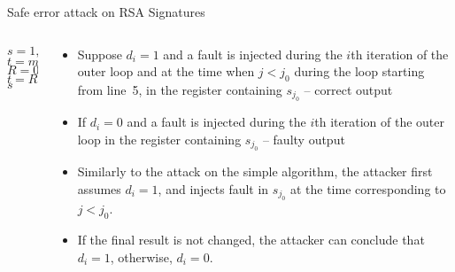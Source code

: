\begin{frame}{Safe error attack on RSA Signatures}
\begin{columns}[T] %
\begin{column}{.45\textwidth}
{\small
{
\setlength{\interspacetitleruled}{0pt}%
\setlength{\algotitleheightrule}{0pt}%
    \begin{algorithm}[H]
$s= 1,\quad$
$t = m$\\
 	{
            $R=0$\\
            $t=R$\\
  	}
  	\Return $s$\\
\end{algorithm}}}
\end{column}%
\hfill%
\begin{column}{.58\textwidth}
\begin{itemize}
        \item Suppose $d_i=1$ and a fault is injected during the $i$th iteration of the outer loop and at the time when $j<j_0$ during the loop starting from line~5, in the register containing $s_{j_0}$ -- correct output 
       \item If $d_i=0$ and a fault is injected during the $i$th iteration of the outer loop in the register containing $s_{j_0}$ -- faulty output
       \item Similarly to the attack on the simple algorithm, the attacker first assumes $d_i=1$, and injects fault in $s_{j_0}$ at the time corresponding to $j<j_0$.
\item If the final result is not changed, the attacker can conclude that $d_i=1$, otherwise, $d_i=0$.
    \end{itemize}
\end{column}%
\end{columns}
\end{frame}

